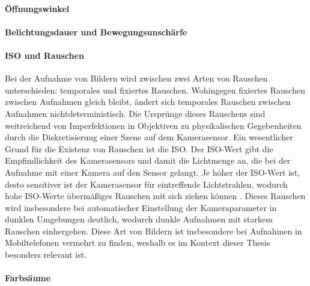 \paragraph{Öffnungswinkel}

\todo{}

\paragraph{Belichtungsdauer und Bewegungsunschärfe}

\todo{}

\paragraph{ISO und Rauschen}

Bei der Aufnahme von Bildern wird zwischen zwei Arten von Rauschen unterschieden: temporales und fixiertes Rauschen. Wohingegen fixiertes Rauschen zwischen Aufnahmen gleich bleibt, ändert sich temporales Rauschen zwischen Aufnahmen nichtdeterministisch. Die Ursprünge dieses Rauschens sind weitreichend von Imperfektionen in Objektiven zu physikalischen Gegebenheiten durch die Diskretisierung einer Szene auf dem Kamerasensor. Ein wesentlicher Grund für die Existenz von Rauschen ist die ISO. Der ISO-Wert gibt die Empfindlichkeit des Kamerasensors und damit die Lichtmenge an, die bei der Aufnahme mit einer Kamera auf den Sensor gelangt. Je höher der ISO-Wert ist, desto sensitiver ist der Kamerasensor für eintreffende Lichtstrahlen, wodurch hohe ISO-Werte übermäßiges Rauschen mit sich ziehen können \cite{camera_everything}. Dieses Rauschen wird insbesondere bei automatischer Einstellung der Kameraparameter in dunklen Umgebungen deutlich, wodurch dunkle Aufnahmen mit starkem Rauschen einhergehen. Diese Art von Bildern ist insbesondere bei Aufnahmen in Mobiltelefonen vermehrt zu finden, weshalb es im Kontext dieser Thesis besonders relevant ist.

\paragraph{Farbsäume}

